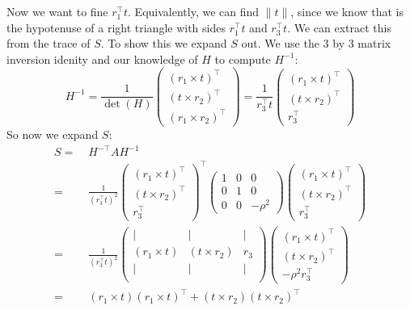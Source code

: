 \documentclass[11pt,english]{article}
\begin{document}
\begin{enumerate}
Now we want to fine $r_1^\top t$. Equivalently, we can find $\|t\|$, since we know that is the hypotenuse of a right
triangle with sides $r_1^\top t$ and $r_3^\top t$. We can extract this from the trace of $S$. To show this we 
expand $S$ out. We use the 3 by 3 matrix inversion idenity and our knowledge of $H$ to compute $H^{-1}$:
\begin{equation*}
H^{-1} = \frac{1}{\det(H)} \begin{pmatrix}
	(r_1 \times t)^\top \\
	(t \times r_2)^\top \\
	(r_1 \times r_2)^\top
\end{pmatrix} = \frac{1}{r_3^\top t} \begin{pmatrix}
	(r_1 \times t)^\top \\
	(t \times r_2)^\top \\
	r_3^\top
\end{pmatrix} 
\end{equation*}
So now we expand $S$:
\begin{align*}
S =&\; H^{-\top} A H^{-1} \\
=&\; \frac{1}{(r_3^\top t)^2} \begin{pmatrix}
	(r_1 \times t)^\top \\
	(t \times r_2)^\top \\
	r_3^\top
\end{pmatrix}^{\top} \begin{pmatrix}
	1 & 0 & 0 \\
	0 & 1 & 0 \\
	0 & 0 & -\rho^2
\end{pmatrix} \begin{pmatrix}
	(r_1 \times t)^\top \\
	(t \times r_2)^\top \\
	r_3^\top
\end{pmatrix} \\
=&\; \frac{1}{(r_3^\top t)^2} \begin{pmatrix}
	| & | & | \\
	(r_1 \times t) & (t \times r_2) & r_3 \\
	| & | & | \\
\end{pmatrix} \begin{pmatrix}
	(r_1 \times t)^\top \\
	(t \times r_2)^\top \\
	-\rho^2 r_3^\top
\end{pmatrix} \\
=&\; (r_1 \times t)(r_1 \times t)^\top + (t \times r_2)(t \times r_2)^\top

\end{align*}
\end{enumerate}
\end{document}
